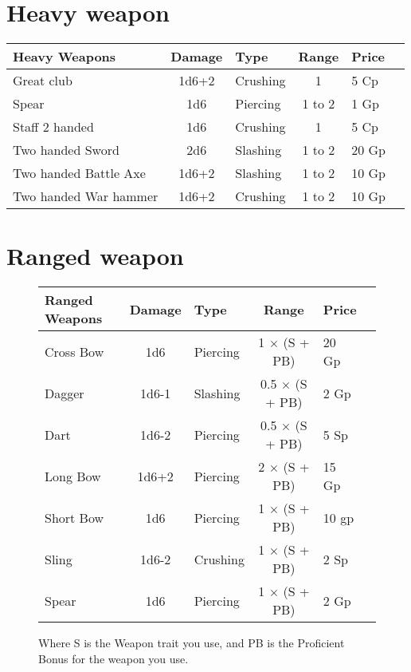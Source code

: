 \section{Heavy weapon}
\begin{center}
\begin{tabular}{|l|c|l|c|l|c|}\hline
\rowcolor{gray!50}
    \textbf{Heavy Weapons}&\textbf{Damage}&\textbf{Type}&\textbf{Range}&\textbf{Price} \\ \hline
    Great club              & 1d6+2 & Crushing  & 1         & 5 Cp      \\ 
    Spear                   & 1d6   & Piercing  & 1 to 2    & 1 Gp      \\ 
    Staff 2 handed          & 1d6   & Crushing  & 1         & 5 Cp      \\ 
    Two handed Sword        & 2d6   & Slashing  & 1 to 2    & 20 Gp     \\ 
    Two handed Battle Axe   & 1d6+2 & Slashing  & 1 to 2    & 10 Gp     \\ 
    Two handed War hammer   & 1d6+2 & Crushing  & 1 to 2    & 10 Gp     \\ 
    \hline
\end{tabular}
\end{center}


\section{Ranged weapon}
\begin{figure}
\centering
{}
\begin{tabular}{|l|c|l|c|l|c|}\hline
\rowcolor{gray!50}
    \textbf{Ranged Weapons}&\textbf{Damage}&\textbf{Type}&\textbf{Range}&\textbf{Price} \\ \hline
    Cross Bow   & 1d6   & Piercing  & 1 $\times$ (S + PB)   & 20 Gp     \\ 
    Dagger      & 1d6-1 & Slashing  & 0.5 $\times$ (S + PB) & 2 Gp      \\ 
    Dart        & 1d6-2 & Piercing  & 0.5 $\times$ (S + PB) & 5 Sp      \\ 
    Long Bow    & 1d6+2 & Piercing  & 2 $\times$ (S + PB)   & 15 Gp     \\ 
    Short Bow   & 1d6   & Piercing  & 1 $\times$ (S + PB)   & 10 gp     \\ 
    Sling       & 1d6-2 & Crushing  & 1 $\times$ (S + PB)   & 2 Sp      \\ 
    Spear       & 1d6   & Piercing  & 1 $\times$ (S + PB)   & 2 Gp      \\ 
    \hline
\end{tabular}
\caption{Where S is the Weapon trait you use, and PB is the Proficient Bonus for the weapon you use.}
\end{figure}
